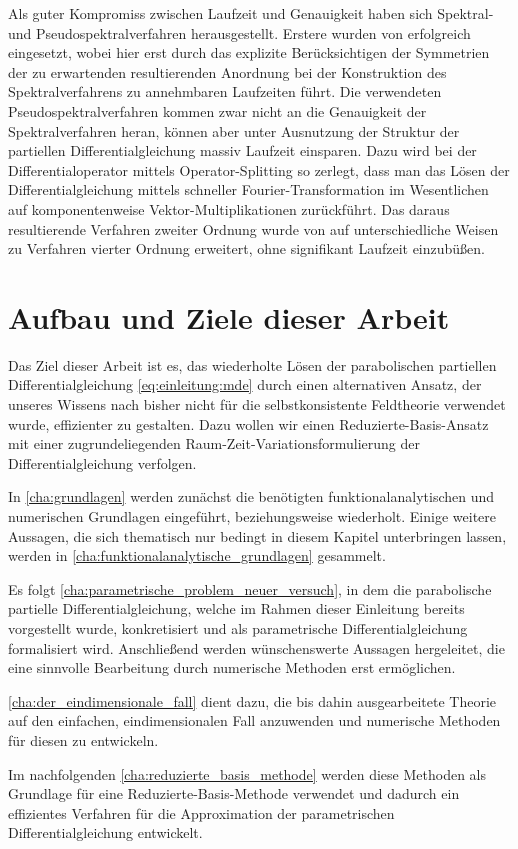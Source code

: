 Als guter Kompromiss zwischen Laufzeit und Genauigkeit haben sich Spektral- und Pseudospektralverfahren herausgestellt.
Erstere wurden von \textcite{Matsen:1994bz} erfolgreich eingesetzt, wobei hier erst durch das explizite Berücksichtigen der Symmetrien der zu erwartenden resultierenden Anordnung bei der Konstruktion des Spektralverfahrens zu annehmbaren Laufzeiten führt.
Die verwendeten Pseudospektralverfahren kommen zwar nicht an die Genauigkeit der Spektralverfahren heran, können aber unter Ausnutzung der Struktur der partiellen Differentialgleichung massiv Laufzeit einsparen.
Dazu wird bei \textcite{Rasmussen:2002kt} der Differentialoperator mittels Operator-Splitting so zerlegt, dass man das Lösen der Differentialgleichung mittels schneller Fourier-Transformation im Wesentlichen auf komponentenweise Vektor-Multiplikationen zurückführt.
Das daraus resultierende Verfahren zweiter Ordnung wurde von \textcite{GarciaCervera:2006uu,Ranjan:2007kl} auf unterschiedliche Weisen zu Verfahren vierter Ordnung erweitert, ohne signifikant Laufzeit einzubüßen.

\section{Aufbau und Ziele dieser Arbeit} %
\label{sec:aufbau_und_ziele_dieser_arbeit}

Das Ziel dieser Arbeit ist es, das wiederholte Lösen der parabolischen partiellen Differentialgleichung \eqref{eq:einleitung:mde} durch einen alternativen Ansatz, der unseres Wissens nach bisher nicht für die selbstkonsistente Feldtheorie verwendet wurde, effizienter zu gestalten.
Dazu wollen wir einen Reduzierte-Basis-Ansatz mit einer zugrundeliegenden Raum-Zeit-Variationsformulierung der Differentialgleichung verfolgen.


In \autoref{cha:grundlagen} werden zunächst die benötigten funktionalanalytischen und numerischen Grundlagen eingeführt, beziehungsweise wiederholt.
Einige weitere Aussagen, die sich thematisch nur bedingt in diesem Kapitel unterbringen lassen, werden in \autoref{cha:funktionalanalytische_grundlagen} gesammelt.

Es folgt \autoref{cha:parametrische_problem_neuer_versuch}, in dem die parabolische partielle Differentialgleichung, welche im Rahmen dieser Einleitung bereits vorgestellt wurde, konkretisiert und als parametrische Differentialgleichung formalisiert wird.
Anschließend werden wünschenswerte Aussagen hergeleitet, die eine sinnvolle Bearbeitung durch numerische Methoden erst ermöglichen.

\autoref{cha:der_eindimensionale_fall} dient dazu, die bis dahin ausgearbeitete Theorie auf den einfachen, eindimensionalen Fall anzuwenden und numerische Methoden für diesen zu entwickeln.

Im nachfolgenden \autoref{cha:reduzierte_basis_methode} werden diese Methoden als Grundlage für eine Reduzierte-Basis-Methode verwendet und dadurch ein effizientes Verfahren für die Approximation der parametrischen Differentialgleichung entwickelt.


